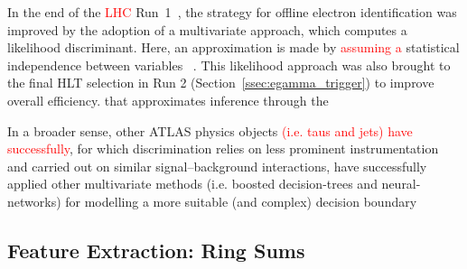 In the end of the \textcolor{red}{LHC} Run~1~\cite{PERF-2016-01}, the strategy for offline electron identification was improved by the adoption of a multivariate approach, which computes a likelihood discriminant. Here, an approximation is made by \textcolor{red}{assuming a} statistical independence between variables ~\cite{kendalls_vol2b}. This likelihood approach was also brought to the final HLT selection in Run 2 (Section~\ref{ssec:egamma_trigger}) to improve overall efficiency. that approximates inference through the




In a broader sense, other ATLAS physics objects \textcolor{red}{(i.e. taus and jets) have successfully}, for
which discrimination relies on less prominent instrumentation and carried out on
similar signal--background interactions, have successfully applied other
multivariate methods (i.e. boosted decision-trees and neural-networks) for
modelling a more suitable (and complex) decision boundary

\subsection{Feature Extraction: Ring Sums} %


